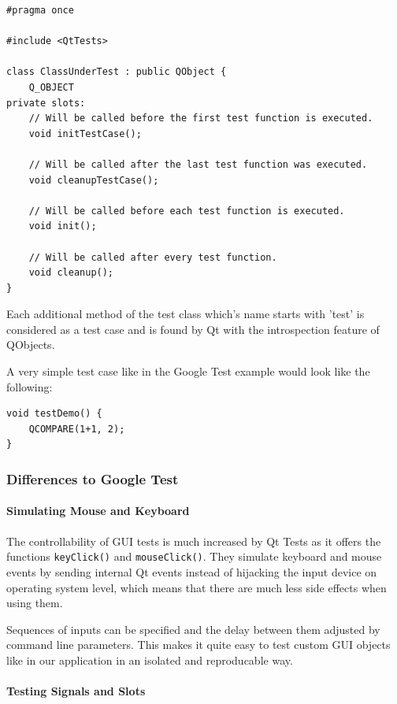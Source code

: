 \documentclass{scrreprt}
\begin{document}
\bigskip
\begin{lstlisting}[title=tests-qt/ClassUnderTest.h]
#pragma once

#include <QtTests>

class ClassUnderTest : public QObject {
	Q_OBJECT
private slots:
	// Will be called before the first test function is executed.
	void initTestCase();
	
	// Will be called after the last test function was executed.
	void cleanupTestCase();
	
	// Will be called before each test function is executed.
	void init();
	
	// Will be called after every test function.
	void cleanup();
}
\end{lstlisting}
\bigskip

Each additional method of the test class which's name starts with 'test' is considered as a test case and is found by Qt with the introspection feature of QObjects.

A very simple test case like in the Google Test example would look like the following:

\begin{lstlisting}[title=tests-qt/Demo.cpp]
void testDemo() {
	QCOMPARE(1+1, 2);
}
\end{lstlisting}

\subsubsection{Differences to Google Test}

\paragraph{Simulating Mouse and Keyboard}

The controllability of GUI tests is much increased by Qt Tests as it offers the functions \texttt{keyClick()} and \texttt{mouseClick()}. They simulate keyboard and mouse events by sending internal Qt events instead of hijacking the input device on operating system level, which means that there are much less side effects when using them. 

Sequences of inputs can be specified and the delay between them adjusted by command line parameters. This makes it quite easy to test custom GUI objects like in our application in an isolated and reproducable way.

\paragraph{Testing Signals and Slots}
\end{document}
